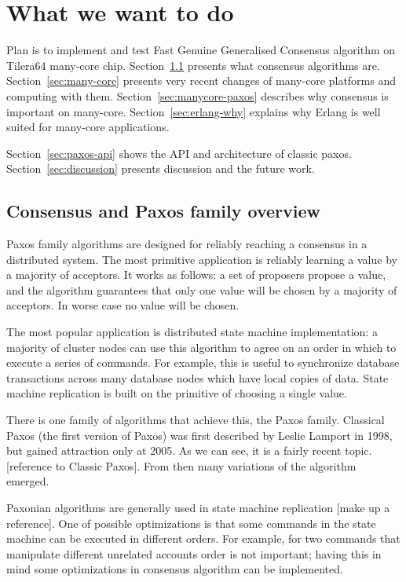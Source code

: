 \documentclass[english,11pt]{article}
\begin{document}
\section{What we want to do}

Plan is to implement and test Fast Genuine Generalised Consensus algorithm on
Tilera64 many-core chip. Section~\ref{sec:paxos-family} presents what consensus
algorithms are. Section~\ref{sec:many-core} presents very recent changes of
many-core platforms and computing with them. Section~\ref{sec:manycore-paxos}
describes why consensus is important on many-core. Section~\ref{sec:erlang-why}
explains why Erlang is well suited for many-core applications.

Section~\ref{sec:paxos-api} shows the API and architecture of classic paxos.
Section~\ref{sec:discussion} presents discussion and the future work.

\subsection{Consensus and Paxos family overview}
\label{sec:paxos-family}

Paxos family algorithms are designed for reliably reaching a consensus in a
distributed system. The most primitive application is reliably learning a value
by a majority of acceptors. It works as follows: a set of proposers propose a
value, and the algorithm guarantees that only one value will be chosen by a
majority of acceptors. In worse case no value will be chosen.

The most popular application is distributed state machine implementation: a
majority of cluster nodes can use this algorithm to agree on an order in which
to execute a series of commands. For example, this is useful to synchronize
database transactions across many database nodes which have local copies of
data. State machine replication is built on the primitive of choosing a single
value.

There is one family of algorithms that achieve this, the Paxos family.
Classical Paxos (the first version of Paxos) was first described by Leslie
Lamport in 1998, but gained attraction only at 2005. As we can see, it is a
fairly recent topic. [reference to Classic Paxos]. From then many variations of
the algorithm emerged.

Paxonian algorithms are generally used in state machine replication [make up a
reference]. One of possible optimizations is that some commands in the state
machine can be executed in different orders. For example, for two commands that
manipulate different unrelated accounts order is not important; having this in
mind some optimizations in consensus algorithm can be implemented.
\end{document}

